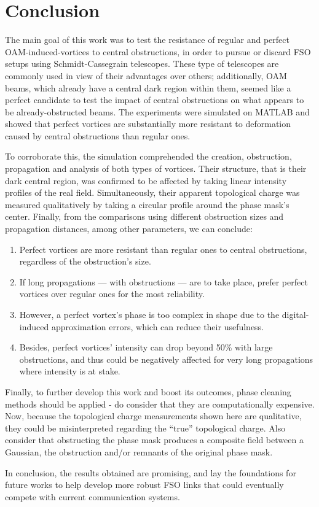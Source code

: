 \chapter{Conclusion} 
\label{Conclusion}

The main goal of this work was to test the resistance of regular and perfect OAM-induced-vortices to central obstructions, in order to pursue or discard FSO setups using Schmidt-Cassegrain telescopes. These type of telescopes are commonly used in view of their advantages over others; additionally, OAM beams, which already have a central dark region within them, seemed like a perfect candidate to test the impact of central obstructions on what appears to be already-obstructed beams. The experiments were simulated on MATLAB and showed that perfect vortices are substantially more resistant to deformation caused by central obstructions than regular ones.

To corroborate this, the simulation comprehended the creation, obstruction, propagation and analysis of both types of vortices. Their structure, that is their dark central region, was confirmed to be affected by taking linear intensity profiles of the real field. Simultaneously, their apparent topological charge was measured qualitatively by taking a circular profile around the phase mask's center. Finally, from the comparisons using different obstruction sizes and propagation distances, among other parameters, we can conclude:

\begin{enumerate}
    \item Perfect vortices are more resistant than regular ones to central obstructions, regardless of the obstruction's size.
    \item If long propagations --- with obstructions --- are to take place, prefer perfect vortices over regular ones for the most reliability.
\newpage
    \item However, a perfect vortex's phase is too complex in shape due to the digital-induced approximation errors, which can reduce their usefulness.
    \item Besides, perfect vortices' intensity can drop beyond 50\% with large obstructions, and thus could be negatively affected for very long propagations where intensity is at stake.
\end{enumerate}

Finally, to further develop this work and boost its outcomes, phase cleaning methods should be applied - do consider that they are computationally expensive. Now, because the topological charge measurements shown here are qualitative, they could be misinterpreted regarding the ``true'' topological charge. Also consider that obstructing the phase mask produces a composite field between a Gaussian, the obstruction and/or remnants of the original phase mask. 

In conclusion, the results obtained are promising, and lay the foundations for future works to help develop more robust FSO links that could eventually compete with current communication systems.